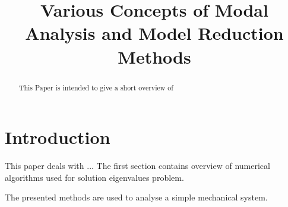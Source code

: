 \documentclass[conference]{journal}%
\begin{document}
	
	\title{Various Concepts of Modal Analysis and Model Reduction Methods}
	
	\author{
		}
	
	\maketitle
	
	\begin{abstract}
		This Paper is intended to give a short overview of 
	\end{abstract}
	
	
	
	
	
	\IEEEpeerreviewmaketitle
	
	\section{Introduction}
	
	This paper deals with ...
	The first section contains overview of numerical algorithms used for solution eigenvalues problem.

	The presented methods are used to analyse a simple mechanical system. 
	
\end{document}
